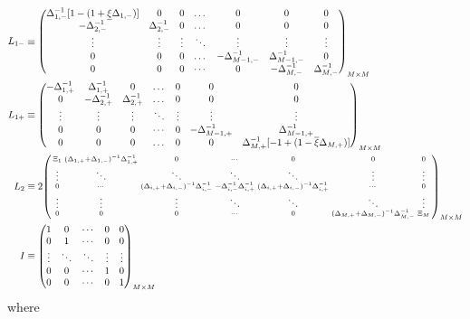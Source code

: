 \documentclass[11pt]{article}
\newenvironment{psmallmatrix}
{\left(\begin{smallmatrix}}
	{\end{smallmatrix}\right)}
\theoremstyle{definition}
\begin{document}
\begin{align}
L_{1-} &\equiv \begin{pmatrix}
\Delta^{-1}_{1,-} [1 - (1 + \underline{\xi} \Delta_{1,-})] &0&0&\dots&0&0&0\\
-\Delta_{2,-}^{-1}&\Delta_{2,-}^{-1}&0&\dots&0&0&0\\
\vdots&\vdots&\vdots&\ddots&\vdots&\vdots&\vdots\\
0&0&0&\dots&-\Delta_{M-1,-}^{-1}&\Delta_{M-1,-}^{-1}&0\\
0&0&0&\cdots&0&-\Delta_{M,-}^{-1}&\Delta_{M,-}^{-1}
\end{pmatrix}_{M\times M}\label{eq:L-1} \\
L_{1+} &\equiv \begin{pmatrix}
-\Delta_{1,+}^{-1}&\Delta_{1,+}^{-1}&0&\dots&0&0&0\\
0&-\Delta_{2,+}^{-1}&\Delta_{2,+}^{-1}&\dots&0&0&0\\
\vdots&\vdots&\vdots&\ddots&\vdots&\vdots&\vdots\\
0&0&0&\cdots&0&-\Delta_{M-1,+}^{-1}&\Delta_{M-1,+}^{-1}\\
0&0&0&\dots&0&0&\Delta_{M,+}^{-1}  [-1 + (1 - \overline{\xi} \Delta_{M,+})]  \\
\end{pmatrix}_{M\times M}\label{eq:L-1-plus} \\
L_2 &\equiv 2 \begin{psmallmatrix}
\Xi_1 &
(\Delta_{1,+}+\Delta_{1,-})^{-1} \Delta_{1,+}^{-1}
&0&\cdots&0&0&0 \\
\vdots&\ddots&\ddots&\ddots&\ddots&\vdots&\vdots\\
0&\cdots&
(\Delta_{i,+}+\Delta_{i,-})^{-1} \Delta_{i,-}^{-1} &
-\Delta_{i,-}^{-1} \Delta_{i,+}^{-1}  & 
 (\Delta_{i,+}+\Delta_{i,-})^{-1} \Delta_{i,+}^{-1}&\cdots&0 \\
\vdots&\vdots&\vdots&\ddots&\ddots&\ddots&\vdots\\
0&0&0&\cdots&0&(\Delta_{M,+}+\Delta_{M,-})^{-1} \Delta_{M,-}^{-1}&\Xi_M
\end{psmallmatrix}_{M\times M}\label{eq:L-2} \\
I &\equiv \begin{pmatrix}
1 & 0 & \cdots & 0 & 0 \\
0 & 1 & \cdots & 0 & 0 \\
\vdots  & \ddots & \ddots &  \vdots  & \vdots   \\
0 & 0 & \cdots & 1 & 0 \\
0 & 0 & \cdots & 0 & 1
\end{pmatrix}_{M\times M}
\end{align}
where
\end{document}
